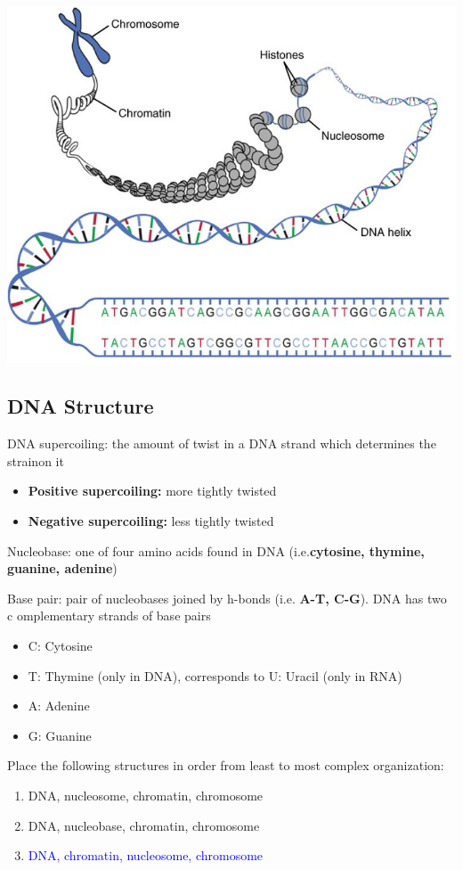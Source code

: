 \documentclass[11pt,fleqn]{book}
\begin{document}
\begin{center}
    \includegraphics[width=0.65\linewidth]{Pictures/Screenshot 2024-02-25 182833.png}
\end{center}
\subsection{DNA Structure}
\begin{descriptions}
    \item[DNA supercoiling:] the amount of twist in a DNA strand which determines the strainon it
    \begin{itemize}
        \item \textbf{Positive supercoiling:} more tightly twisted
        \item \textbf{Negative supercoiling:} less tightly twisted
    \end{itemize}
    \item[Nucleobase:] one of four amino acids found in DNA (i.e.\textbf{cytosine, thymine, guanine, adenine})
    \item[Base pair:] pair of nucleobases joined by h-bonds (i.e. \textbf{A-T, C-G}). DNA has two c omplementary strands of base pairs
    \begin{itemize}
        \item C: Cytosine
        \item T: Thymine (only in DNA), corresponds to U: Uracil (only in RNA)
        \item A: Adenine
        \item G: Guanine
    \end{itemize}
\end{descriptions}
\begin{exercise}
    Place the following structures in order from least to most complex organization:
    \begin{enumerate}
        \item DNA, nucleosome, chromatin, chromosome
        \item DNA, nucleobase, chromatin, chromosome
        \item \textcolor{blue}{DNA, chromatin, nucleosome, chromosome}
    \end{enumerate}
\end{exercise}
\end{document}
